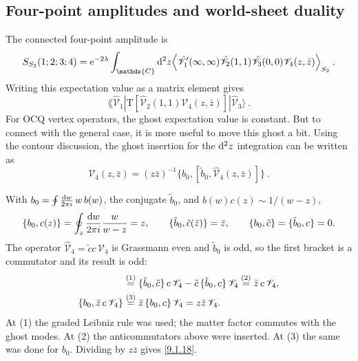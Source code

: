 \subsection*{Four-point amplitudes and world-sheet duality}

The connected four-point amplitude is
\begin{equation}
	S_{S_{2}}(1; 2; 3; 4) = \me^{-2 \lambda} \int_{\mathds{C}} \dif^{2} z 
	\Bigl\langle \hat{\mathscr{V}}_{1}^{\prime}(\infty, \infty) \hat{\mathscr{V}}_{2}(1,1) \hat{\mathscr{V}}_{3}(0,0) 
	\mathscr{V}_{4}(z, \bar{z})\Bigr\rangle_{S_{2}} \:.
	\label{9.1.16}
\end{equation}
Writing this expectation value as a matrix element gives
\begin{equation}
	\lAngle\hat{\mathscr{V}}_{1}|\mathrm{T}[\hat{\mathscr{V}}_{2}(1,1) \mathscr{V}_{4}(z, \bar{z})]| 
	\hat{\mathscr{V}}_{3}\rangle \:. \label{9.1.17}
\end{equation}
For OCQ vertex operators, the ghost expectation value is constant. But to connect with the general case, it is more useful to move this ghost a bit. Using the contour discussion, the ghost insertion for the $\mathrm{d}^{2} z$ integration can be written as
\begin{equation}
	\mathscr{V}_{4}(z, \bar{z})=(z \bar{z})^{-1}\bigl \{b_{0}, [\tilde{b}_{0}, \hat{\mathscr{V}}_{4}(z, \bar{z})]\bigr\} \:.
	\label{9.1.18}
\end{equation}
\begin{tcolorbox}[breakable]
	\begin{remark}
		With $b_0=\oint\frac{\mathrm{d} w}{2\pi i}\,w\,b(w)$, the conjugate $\tilde b_0$, and $b(w)c(z)\sim 1/(w-z)$,
		\begin{equation*}
			\{b_0,c(z)\}=\oint_z\frac{\mathrm{d} w}{2\pi i}\frac{w}{w-z}=z,\qquad \{\tilde b_0,\tilde c(\bar z)\}=\bar z,\qquad \{b_0,\tilde c\}=\{\tilde b_0,c\}=0 .
		\end{equation*}
		The operator $\hat{\mathscr V}_4=\tilde c c\,\mathscr V_4$ is Grassmann even and $\tilde b_0$ is odd, so the first bracket is a commutator and its result is odd:
		\begin{align*}
			[\tilde b_0,\tilde c c\,\mathscr V_4] &\eqs{1} \{\tilde b_0,\tilde c\}\,c\,\mathscr V_4-\tilde c\,\{\tilde b_0,c\}\,\mathscr V_4 \eqs{2} \bar z\,c\,\mathscr V_4 ,\\
			\{b_0,\bar z\,c\,\mathscr V_4\} &\eqs{3} \bar z\,\{b_0,c\}\,\mathscr V_4 = z\bar z\,\mathscr V_4 .
		\end{align*}
		At (1) the graded Leibniz rule was used; the matter factor commutes with the ghost modes. At (2) the anticommutators above were inserted. At (3) the same was done for $b_0$. Dividing by $z\bar z$ gives \eqref{9.1.18}.
	\end{remark}
\end{tcolorbox}
